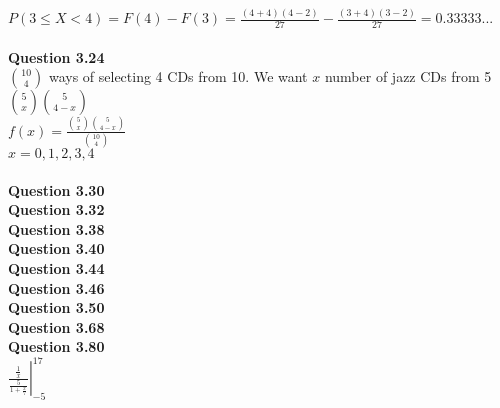 \documentclass{article}
\begin{document}
    $P(3\leq X<4) = F(4) - F(3) = \frac{(4+4)(4-2)}{27} - \frac{(3+4)(3-2)}{27} = 0.33333...$\\\\
    \textbf{Question 3.24}\\
    $\binom{10}{4}$ ways of selecting 4 CDs from 10. We want $x$ number of jazz CDs from 5 $\binom{5}{x}\binom{5}{4-x}$\\
    $f(x) = \frac{\binom{5}{x}\binom{5}{4-x}}{\binom{10}{4}}$\\
    $x = 0,1,2,3,4$\\\\
    \textbf{Question 3.30}\\
    \textbf{Question 3.32}\\
    \textbf{Question 3.38}\\
    \textbf{Question 3.40}\\
    \textbf{Question 3.44}\\
    \textbf{Question 3.46}\\
    \textbf{Question 3.50}\\
    \textbf{Question 3.68}\\
    \textbf{Question 3.80}\\

    $  \left.\frac{\frac{1}{x}}{\frac{5}{1+\frac{x}{7}}}\right\vert_{-5}^{17}$\\
    
\end{document}
